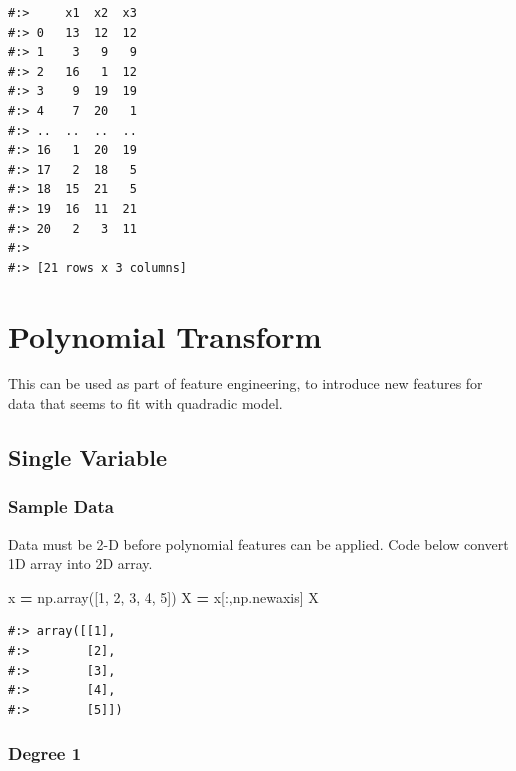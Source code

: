 \documentclass[
]{book}
\newenvironment{Shaded}{\begin{snugshade}}{\end{snugshade}}
\newcommand{\DecValTok}[1]{\textcolor[rgb]{0.06,0.06,0.06}{#1}}
\newcommand{\NormalTok}[1]{#1}
\newcommand{\OperatorTok}[1]{\textcolor[rgb]{0.43,0.43,0.43}{\textbf{#1}}}
\begin{document}
\begin{verbatim}
#:>     x1  x2  x3
#:> 0   13  12  12
#:> 1    3   9   9
#:> 2   16   1  12
#:> 3    9  19  19
#:> 4    7  20   1
#:> ..  ..  ..  ..
#:> 16   1  20  19
#:> 17   2  18   5
#:> 18  15  21   5
#:> 19  16  11  21
#:> 20   2   3  11
#:> 
#:> [21 rows x 3 columns]
\end{verbatim}

\hypertarget{polynomial-transform}{%
\section{Polynomial Transform}\label{polynomial-transform}}

This can be used as part of feature engineering, to introduce new features for data that seems to fit with quadradic model.

\hypertarget{single-variable}{%
\subsection{Single Variable}\label{single-variable}}

\hypertarget{sample-data-21}{%
\subsubsection{Sample Data}\label{sample-data-21}}

Data must be 2-D before polynomial features can be applied. Code below convert 1D array into 2D array.

\begin{Shaded}
\begin{Highlighting}[]
\NormalTok{x }\OperatorTok{=}\NormalTok{ np.array([}\DecValTok{1}\NormalTok{, }\DecValTok{2}\NormalTok{, }\DecValTok{3}\NormalTok{, }\DecValTok{4}\NormalTok{, }\DecValTok{5}\NormalTok{])}
\NormalTok{X }\OperatorTok{=}\NormalTok{ x[:,np.newaxis]}
\NormalTok{X}
\end{Highlighting}
\end{Shaded}

\begin{verbatim}
#:> array([[1],
#:>        [2],
#:>        [3],
#:>        [4],
#:>        [5]])
\end{verbatim}

\hypertarget{degree-1}{%
\subsubsection{Degree 1}\label{degree-1}}
\end{document}
